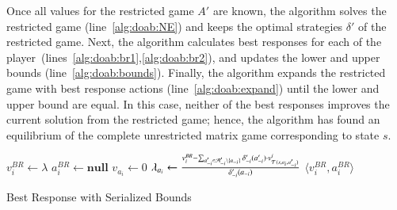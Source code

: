 Once all values for the restricted game $A'$ are known, the algorithm solves the restricted game (line~\ref{alg:doab:NE}) and keeps the optimal strategies $\delta'$ of the restricted game. Next, the algorithm calculates best responses for each of the player~(lines~\ref{alg:doab:br1},\ref{alg:doab:br2}), and updates the lower and upper bounds (line~\ref{alg:doab:bounds}). Finally, the algorithm expands the restricted game with best response actions (line~\ref{alg:doab:expand}) until the lower and upper bound are equal. In this case, neither of the best responses improves the current solution from the restricted game; hence, the algorithm has found an equilibrium of the complete unrestricted matrix game corresponding to state $s$.


\begin{algorithm2e}[t]
\small
{}
$v^{BR}_i \leftarrow \lambda$ \;
$a_i^{BR} \leftarrow \textbf{null}$ \;
 {%
	$v_{a_i} \leftarrow 0$\;
	 {\label{alg:br:opp}
		$\lambda_{a_i} \leftarrow \frac{v_i^{BR} - \sum_{a'_{-i} \in \mathcal{A}'_{-i} \setminus \lbrace a_{-i} \rbrace} \delta'_{-i}(a'_{-i}) \cdot v^i_{\mathcal{T}(s,a_i,a'_{-i})}}{\delta'_{-i}(a_{-i})}$\; \label{alg:br:bound}
	}
}
\Return $\langle v_i^{BR}, a_i^{BR} \rangle$ 
\caption{Best Response with Serialized Bounds}\label{alg:br}
\end{algorithm2e}

